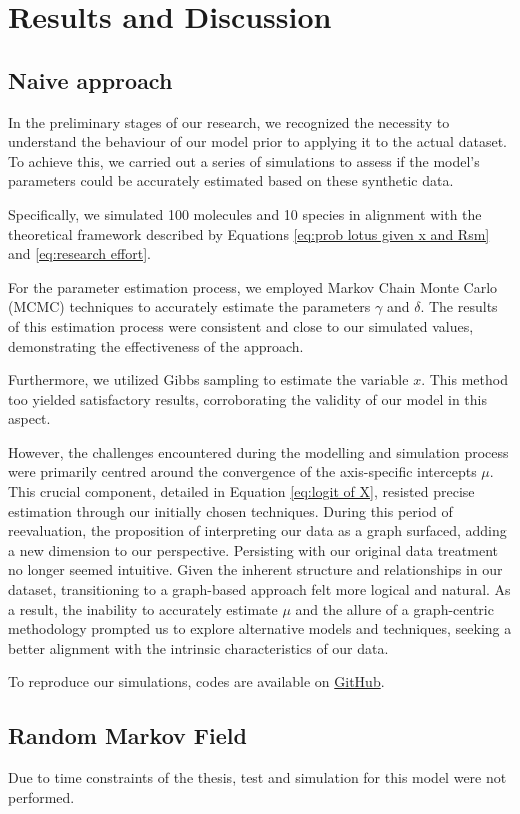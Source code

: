 \documentclass[
11pt, %
oneside, %
english, %
singlespacing, %
headsepline, %
chapterinoneline, %
]{MastersDoctoralThesis} %
\begin{document}
\chapter{Results and Discussion}
\section{Naive approach}
In the preliminary stages of our research, we recognized the necessity to understand the behaviour of our model prior to applying it to the actual dataset. To achieve this, we carried out a series of simulations to assess if the model's parameters could be accurately estimated based on these synthetic data.

Specifically, we simulated 100 molecules and 10 species in alignment with the theoretical framework described by Equations \ref{eq:prob lotus given x and Rsm} and \ref{eq:research effort}.

For the parameter estimation process, we employed Markov Chain Monte Carlo (MCMC) techniques to accurately estimate the parameters $\gamma$ and $\delta$. The results of this estimation process were consistent and close to our simulated values, demonstrating the effectiveness of the approach.

Furthermore, we utilized Gibbs sampling to estimate the variable $x$. This method too yielded satisfactory results, corroborating the validity of our model in this aspect.

However, the challenges encountered during the modelling and simulation process were primarily centred around the convergence of the axis-specific intercepts $\mu$. This crucial component, detailed in Equation \ref{eq:logit of X}, resisted precise estimation through our initially chosen techniques. During this period of reevaluation, the proposition of interpreting our data as a graph surfaced, adding a new dimension to our perspective. Persisting with our original data treatment no longer seemed intuitive. Given the inherent structure and relationships in our dataset, transitioning to a graph-based approach felt more logical and natural. As a result, the inability to accurately estimate $\mu$ and the allure of a graph-centric methodology prompted us to explore alternative models and techniques, seeking a better alignment with the intrinsic characteristics of our data.

To reproduce our simulations, codes are available on \href{https://github.com/commons-research/anticipated-lotus}{GitHub}.

\section{Random Markov Field}
Due to time constraints of the thesis, test and simulation for this model were not performed.
\end{document}
